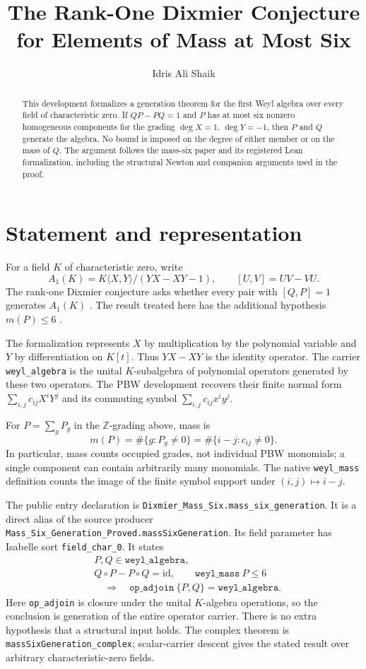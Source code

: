 \documentclass[11pt,a4paper]{article}
\title{The Rank-One Dixmier Conjecture for Elements of Mass at Most Six}
\author{Idris Ali Shaik}
\date{}
\begin{document}
\maketitle
\begin{abstract}
This development formalizes a generation theorem for the first Weyl algebra
 over every field of characteristic zero. If $QP-PQ=1$ and $P$ has at most
six nonzero homogeneous components for the grading $\deg X=1$, $\deg Y=-1$,
then $P$ and $Q$ generate the algebra. No bound is imposed on the degree of
either member or on the mass of $Q$. The argument follows the mass-six
paper and its registered Lean formalization, including the structural
Newton and companion arguments used in the proof.
\end{abstract}

\section{Statement and representation}
For a field $K$ of characteristic zero, write
\[
 A_1(K)=K\langle X,Y\rangle/(YX-XY-1),\qquad [U,V]=UV-VU.
\]
The rank-one Dixmier conjecture asks whether every pair with $[Q,P]=1$
generates $A_1(K)$ \cite{Dixmier1968}. The result treated here has the
additional hypothesis $m(P)\leq 6$ \cite{Shaik2026Paper}.

The formalization represents $X$ by multiplication by the polynomial
variable and $Y$ by differentiation on $K[t]$. Thus $YX-XY$ is the identity
operator. The carrier \texttt{weyl\_algebra} is the unital $K$-subalgebra of
polynomial operators generated by these two operators. The PBW development
recovers their finite normal form $\sum_{i,j}c_{ij}X^iY^j$ and its commuting
symbol $\sum_{i,j}c_{ij}x^iy^j$.

For $P=\sum_g P_g$ in the $\mathbb Z$-grading above, mass is
\[
 m(P)=\#\{g:P_g\ne 0\}
     =\#\{i-j:c_{ij}\ne 0\}.
\]
In particular, mass counts occupied grades, not individual PBW monomials;
a single component can contain arbitrarily many monomials. The native
\texttt{weyl\_mass} definition counts the image of the finite symbol support
under $(i,j)\mapsto i-j$.

The public entry declaration is
\texttt{Dixmier\_\allowbreak Mass\_\allowbreak Six.\allowbreak mass\_\allowbreak six\_\allowbreak generation}. It is a direct alias of
the source producer
\texttt{Mass\_\allowbreak Six\_\allowbreak Generation\_\allowbreak Proved.\allowbreak massSixGeneration}.
Its field parameter has Isabelle sort \texttt{field\_char\_0}. It states
\[
 \begin{aligned}
 &P,Q\in\texttt{weyl\_algebra},\\
 &Q\circ P-P\circ Q=\mathrm{id},\qquad
   \texttt{weyl\_mass}\ P\leq 6\\
 &\quad\Longrightarrow\quad
   \texttt{op\_adjoin}\ \{P,Q\}=\texttt{weyl\_algebra}.
 \end{aligned}
\]
Here \texttt{op\_adjoin} is closure under the unital $K$-algebra operations,
so the conclusion is generation of the entire operator carrier. There is
no extra hypothesis that a structural input holds. The complex theorem is
\texttt{massSixGeneration\_complex}; scalar-carrier descent gives the stated
result over arbitrary characteristic-zero fields.
\end{document}
